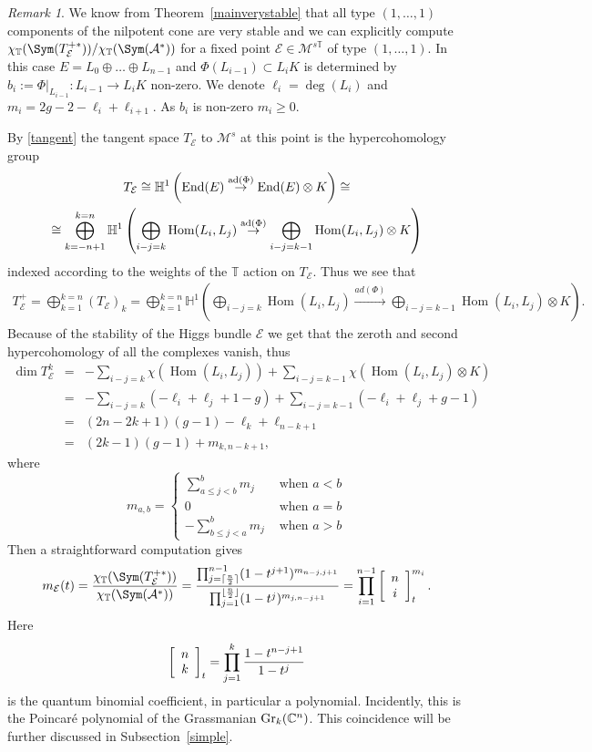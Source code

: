 \documentclass[12pt]{article}
\numberwithin{equation}{section}
\theoremstyle{remark}
\newtheorem{remark}[theorem]{Remark}
\theoremstyle{definition}
\numberwithin{theorem}{section}
\def\beq{\begin{eqnarray}}
\def\eeq{\end{eqnarray}}
\def\bes{\begin{eqnarray*}}
\def\ees{\end{eqnarray*}}
\def\calE{{\mathcal E}}
\DeclareMathOperator{\Hom}{Hom}
\def\C{\mathbb{C}}
\def\M{{\mathcal{M}}}
\def\calA{{\mathcal{A}}}
\newcommand{\T}{{\mathbb{T}}}
\newcommand{\ad}{\textnormal{ad}}
\newcommand{\Gr}{\textnormal{Gr}}
\newcommand{\End}{\textnormal{End}}
\renewcommand{\1}{\mathbbm{1}}
\renewcommand{\H}{\mathbb{H}}
\begin{document}
\begin{remark}\label{remark111}
	We know from Theorem~\ref{mainverystable} that all type $(1,\dots,1)$ components of the nilpotent cone are very stable and we can explicitly compute  ${{ \chi_\T(\Sym(T^{+*}_\calE))/ \chi_\T(\Sym(\calA^*))}}$ for a fixed point  $\calE\in \M^{s\T}$ of type $(1,\dots,1)$. In this case $E=L_0\oplus \dots \oplus L_{n-1}$ and  $\Phi(L_{i-1})\subset L_{i}K$ is determined by $b_i:=\Phi|_{L_{i-1}}:L_{i-1}\to L_{i}K$ non-zero. 
	We denote $\ell_i=\deg(L_i)$ and $m_i=2g-2-\ell_i+\ell_{i+1}$. As $b_i$ is non-zero $m_i\geq 0$. 
	
	By \eqref{tangent} the tangent space $T_\calE$  to ${\mathcal M}^s$ at this point is the hypercohomology group
	\begin{multline*}T_\calE\cong \H^1\left(\End(E)\stackrel{\ad(\Phi)}{\rightarrow}\End(E)\otimes K\right)\cong \\ \cong \bigoplus_{k=-n+1}^{k=n} \H^1\left(\bigoplus_{i-j=k}\Hom(L_i,L_{j})\stackrel{\ad(\Phi)}{\rightarrow}\bigoplus_{i-j=k-1}\Hom(L_i,L_{j})\otimes K\right)\end{multline*} indexed according to the weights of the $\T$ action on $T_\calE$. Thus we see that \bes T^+_\calE= \bigoplus_{k=1}^{k=n} (T_\calE)_k = \bigoplus_{k=1}^{k=n} \H^1\left(\bigoplus_{i-j=k}\Hom(L_i,L_{j})\stackrel{ad(\Phi)}{\rightarrow}\bigoplus_{i-j=k-1}\Hom(L_i,L_{j})\otimes K\right).\ees Because of the stability of the Higgs bundle $\calE$ \cite[Theorem 4.3]{hausel-vanishing} we get that the zeroth and second hypercohomology of all the complexes vanish, thus \bes\dim T^k_\calE&=&-\sum_{i-j=k} \chi(\Hom(L_i,L_j)) +\sum_{i-j=k-1} \chi(\Hom(L_i,L_j)\otimes K)\\ &=& -\sum_{i-j=k} (-\ell_i+\ell_j+1-g) + \sum_{i-j=k-1} (-\ell_i+\ell_j + g-1) \\ &=& (2n-2k+1)(g-1)-\ell_k+\ell_{n-k+1} \\ &=& (2k-1)(g-1) + m_{k,n-k+1},\ees where $$m_{a,b}=\left\{ \begin{array}{cc}\sum_{a\leq j< b}^b m_j & {\mbox{ when } a<b}\\  0 & {\mbox{ when } a=b} \\  -\sum_{b\leq j<a}^b m_j & {\mbox{ when } a> b} \end{array} \right.$$
	Then a straightforward computation gives \beq\label{explicit}m_\calE(t)={{ \chi_\T(\Sym(T^{+*}_\calE))\over \chi_\T(\Sym(\calA^*))}}={\prod_{j=\lceil{n \over 2}\rceil}^{{n-1}} (1-t^{j+1})^{m_{n-j,j+1}}\over \prod_{j=1}^{\lfloor {n\over 2} \rfloor} (1-t^j)^{m_{j,n-j+1} }}=\prod_{i=1}^{n-1} \left[\begin{array}{c} n \\ i\end{array}\right]^{m_i}_t.\eeq 
	Here  $$\left[\begin{array}{c} n \\ k \end{array}\right]_t=\prod_{j=1}^k{1-t^{n-j+1} \over 1-t^j }$$ is the quantum binomial coefficient, in particular a polynomial. Incidently, this is the Poincar\'e polynomial of the Grassmanian $\Gr_k(\C^n)$. This coincidence will be further discussed in Subsection~\ref{simple}. 
	

\end{remark}
\end{document}
